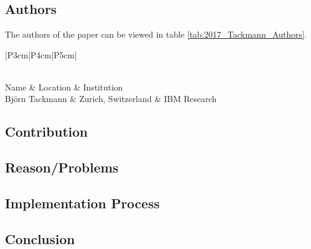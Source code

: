 \clearpage
\section*{\citet{2017_Tackmann}}

\subsection*{Authors}
The authors of the paper can be viewed in table \ref{tab:2017_Tackmann_Authors}.
\begin{longtable}{ |P{3cm}|P{4cm}|P{5cm}| }
	\caption{Authors} \label{tab:2017_Tackmann_Authors} \\
	\hline
 	Name & Location & Institution \\ [0.5ex] 
 	\hline\hline
 	\endhead
 	Björn Tackmann & Zurich, Switzerland  & IBM Research  \\
	 \hline
\end{longtable}


\subsection*{Contribution}



\subsection*{Reason/Problems}



\subsection*{Implementation Process}


\subsection*{Conclusion}

